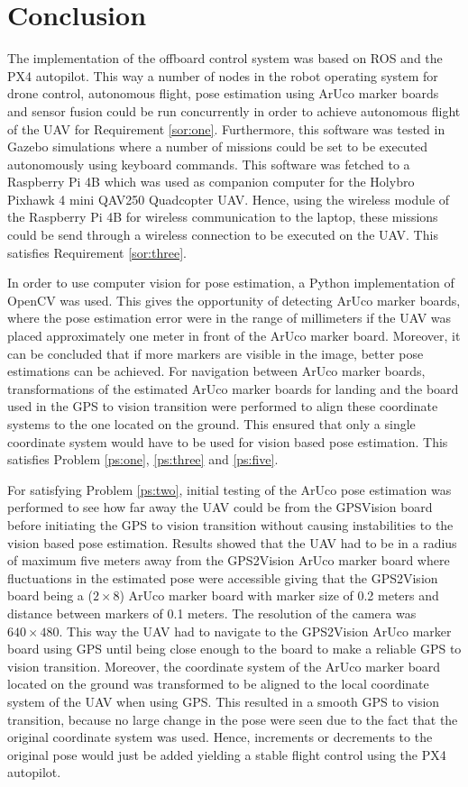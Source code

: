 \documentclass[../Head/report.tex]{subfiles}
\begin{document}
\section{Conclusion}
\label{sec:conclusion}

The implementation of the offboard control system was based on ROS and the PX4 autopilot. This way a number of nodes in the robot operating system for drone control, autonomous flight, pose estimation using ArUco marker boards and sensor fusion could be run concurrently in order to achieve autonomous flight of the UAV for Requirement \ref{sor:one}. Furthermore, this software was tested in Gazebo simulations where a number of missions could be set to be executed autonomously using keyboard commands. This software was fetched to a Raspberry Pi 4B which was used as companion computer for the Holybro Pixhawk 4 mini QAV250 Quadcopter UAV. Hence, using the wireless module of the Raspberry Pi 4B for wireless communication to the laptop, these missions could be send through a wireless connection to be executed on the UAV. This satisfies Requirement \ref{sor:three}.     

In order to use computer vision for pose estimation, a Python implementation of OpenCV was used. This gives the opportunity of detecting ArUco marker boards, where the pose estimation error were in the range of millimeters if the UAV was placed approximately one meter in front of the ArUco marker board. Moreover, it can be concluded that if more markers are visible in the image, better pose estimations can be achieved. For navigation between ArUco marker boards, transformations of the estimated ArUco marker boards for landing and the board used in the GPS to vision transition were performed to align these coordinate systems to the one located on the ground. This ensured that only a single coordinate system would have to be used for vision based pose estimation. This satisfies Problem \ref{ps:one}, \ref{ps:three} and \ref{ps:five}.

For satisfying Problem \ref{ps:two}, initial testing of the ArUco pose estimation was performed to see how far away the UAV could be from the GPSVision board before initiating the GPS to vision transition without causing instabilities to the vision based pose estimation. Results showed that the UAV had to be in a radius of maximum five meters away from the GPS2Vision ArUco marker board where fluctuations in the estimated pose were accessible giving that the GPS2Vision board being a ($2 \times 8 $) ArUco marker board with marker size of 0.2 meters and distance between markers of 0.1 meters. The resolution of the camera was $640 \times 480$. This way the UAV had to navigate to the GPS2Vision ArUco marker board using GPS until being close enough to the board to make a reliable GPS to vision transition. Moreover, the coordinate system of the ArUco marker board located on the ground was transformed to be aligned to the local coordinate system of the UAV when using GPS. This resulted in a smooth GPS to vision transition, because no large change in the pose were seen due to the fact that the original coordinate system was used. Hence, increments or decrements to the original pose would just be added yielding a stable   flight control using the PX4 autopilot.
\end{document}
